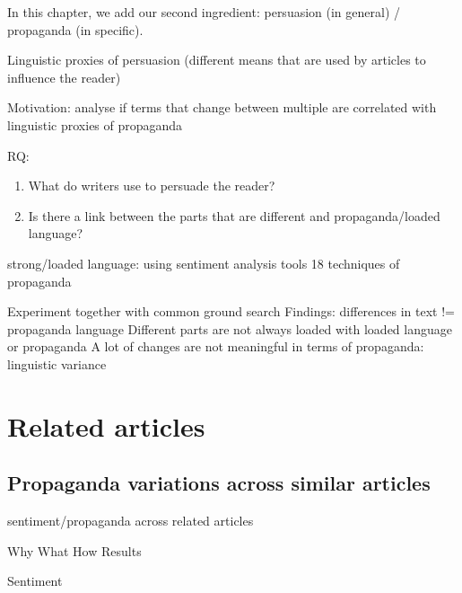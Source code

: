 \label{chap:linguistic_persuasion}

In this chapter, we add our second ingredient: persuasion (in general) / propaganda (in specific).

Linguistic proxies of persuasion (different means that are used by articles to influence the reader)

Motivation: analyse if terms that change between multiple are correlated with linguistic proxies of propaganda


RQ: 
\begin{enumerate}
    \item What do writers use to persuade the reader?
    \item Is there a link between the parts that are different and propaganda/loaded language?
\end{enumerate}



strong/loaded language: using sentiment analysis tools 
18 techniques of propaganda


Experiment together with common ground search
Findings: differences in text != propaganda language
Different parts are not always loaded with loaded language or propaganda
A lot of changes are not meaningful in terms of propaganda: linguistic variance


\section{Related articles}

\subsection{Propaganda variations across similar articles}

sentiment/propaganda across related articles

Why
What
How
Results


Sentiment


